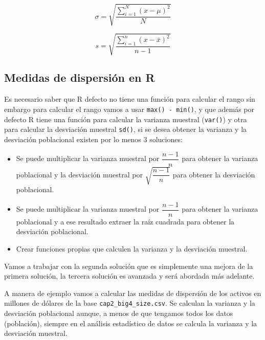 \documentclass[]{book}
\providecommand{\tightlist}{%
  \setlength{\itemsep}{0pt}\setlength{\parskip}{0pt}}
\begin{document}
\begin{equation} 
  \sigma = \sqrt{\dfrac{\sum_{i=1}^{N}\left(x- \mu \right)^2}{N}}
  \label{eq:desp}
\end{equation}

\begin{equation} 
  s = \sqrt{\dfrac{\sum_{i=1}^{n}\left(x- \bar{x} \right)^2}{n-1}}
  \label{eq:desm}
\end{equation}

\subsection{Medidas de dispersión en
R}\label{medidas-de-dispersion-en-r}

Es necesario saber que R defecto no tiene una función para calcular el
rango sin embargo para calcular el rango vamos a usar
\texttt{max()\ -\ min()}, y que además por defecto R tiene una función
para calcular la varianza muestral (\texttt{var()}) y otra para calcular
la desviación muestral \texttt{sd()}, si se desea obtener la varianza y
la desviación poblacional existen por lo menos 3 soluciones:

\begin{itemize}
\tightlist
\item
  Se puede multiplicar la varianza muestral por \(\dfrac{n-1}{n}\) para
  obtener la varianza poblacional y la desviación muestral por
  \(\sqrt{\dfrac{n-1}{n}}\) para obtener la desviación poblacional.
\item
  Se puede multiplicar la varianza muestral por \(\dfrac{n-1}{n}\) para
  obtener la varianza poblacional y a ese resultado extraer la raíz
  cuadrada para obtener la desviación poblacional.
\item
  Crear funciones propias que calculen la varianza y la desviación
  muestral.
\end{itemize}

Vamos a trabajar con la segunda solución que es simplemente una mejora
de la primera solución, la tercera solución es avanzada y será abordada
más adelante.

A manera de ejemplo vamos a calcular las medidas de dispersión de los
activos en millones de dólares de la base \texttt{cap2\_big4\_size.csv}.
Se calculan la varianza y la desviación poblacional aunque, a menos de
que tengamos todos los datos (población), siempre en el análisis
estadístico de datos se calcula la varianza y la desviación muestral.
\end{document}
